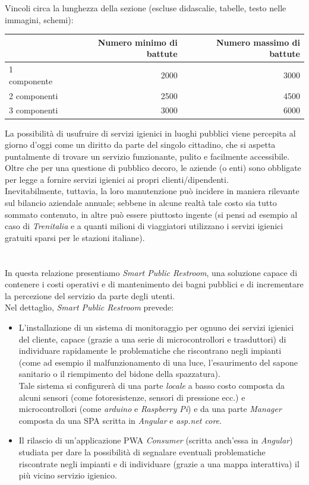 \documentclass[12pt]{article}
\begin{document}
Vincoli circa la lunghezza della sezione (escluse didascalie, tabelle, testo nelle immagini, schemi):

\vspace{1cm}
\begin{tabular}{l|rr}
 & Numero minimo di battute & Numero massimo di battute \\
 \hline
 1 componente & 2000 & 3000 \\
 2 componenti & 2500 & 4500 \\
 3 componenti & 3000 & 6000 \\
 \hline
\end{tabular}


\newpage
La possibilità di usufruire di servizi igienici in luoghi pubblici viene percepita al giorno d'oggi come un diritto da parte del singolo cittadino, che si aspetta puntalmente di trovare un servizio funzionante, pulito e facilmente accessibile.\\
Oltre che per una questione di pubblico decoro, le aziende (o enti) sono obbligate per legge\cite{articolo1} a fornire servizi igienici ai propri clienti/dipendenti.\\
Inevitabilmente, tuttavia, la loro manutenzione può incidere in maniera rilevante sul bilancio aziendale annuale; sebbene in alcune realtà tale costo sia tutto sommato contenuto, in altre può essere piuttosto ingente (si pensi ad esempio al caso di \textit{Trenitalia} e a quanti milioni di viaggiatori utilizzano i servizi igienici gratuiti sparsi per le stazioni italiane).\\
\\\\
In questa relazione presentiamo \textit{Smart Public Restroom}, una soluzione capace di contenere i costi operativi e di mantenimento dei bagni pubblici e di incrementare la percezione del servizio da parte degli utenti.\\
Nel dettaglio, \textit{Smart Public Restroom} prevede:
\begin{itemize}
	\item L'installazione di un sistema di monitoraggio per ognuno dei servizi igienici del cliente, capace (grazie a una serie di microcontrollori e trasduttori) di individuare rapidamente le problematiche che riscontrano negli impianti (come ad esempio il malfunzionamento di una luce, l'esaurimento del sapone sanitario o il riempimento del bidone della spazzatura).\\
	Tale sistema si configurerà di una parte \textit{locale} a basso costo composta da alcuni sensori (come fotoresistenze, sensori di pressione ecc.) e microcontrollori (come \textit{arduino} e \textit{Raspberry Pi}) e da una parte \textit{Manager} composta da una SPA scritta in \textit{Angular} e \textit{asp.net core}.
	\item Il rilascio di un'applicazione PWA \textit{Consumer} (scritta anch'essa in \textit{Angular}) studiata per dare la possibilità di segnalare eventuali problematiche riscontrate negli impianti e di individuare (grazie a una mappa interattiva) il più vicino servizio igienico.\\
\end{itemize}
\end{document}
